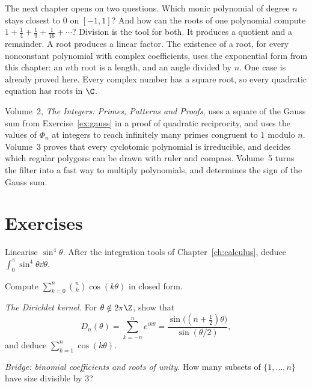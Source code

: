 The next chapter opens on two questions. Which monic polynomial of degree $n$ stays closest to $0$ on $[-1,1]$? And how can the roots of one polynomial compute $1+\frac14+\frac19+\frac1{16}+\cdots$? Division is the tool for both. It produces a quotient and a remainder. A root produces a linear factor. The existence of a root, for every nonconstant polynomial with complex coefficients, uses the exponential form from this chapter: an $n$th root is a length, and an angle divided by $n$. One case is already proved here. Every complex number has a square root, so every quadratic equation has roots in $\C$.

Volume~2, \emph{The Integers: Primes, Patterns and Proofs}, uses a square of the Gauss sum from Exercise~\ref{ex:gauss} in a proof of quadratic reciprocity, and uses the values of $\Phi_n$ at integers to reach infinitely many primes congruent to $1$ modulo $n$. Volume~3 proves that every cyclotomic polynomial is irreducible, and decides which regular polygons can be drawn with ruler and compass. Volume~5 turns the filter into a fast way to multiply polynomials, and determines the sign of the Gauss sum.

\section{Exercises}

\begin{exercise}[$\star$]\label{ex:lin}
Linearise $\sin^4\theta$. After the integration tools of Chapter~\ref{ch:calculus}, deduce $\displaystyle\int_0^{\pi}\sin^4\theta\dd\theta$.
\end{exercise}

\begin{exercise}[$\star$]\label{ex:binomcos}
Compute $\displaystyle\sum_{k=0}^n\binom nk\cos(k\theta)$ in closed form.
\end{exercise}

\begin{exercise}[$\star\star$]\label{ex:dirichlet}
\emph{The Dirichlet kernel.} For $\theta\notin2\pi\Z$, show that
\[
D_n(\theta)=\sum_{k=-n}^ne^{ik\theta}=\frac{\sin\bigl((n+\tfrac12)\theta\bigr)}{\sin(\theta/2)},
\]
and deduce $\displaystyle\sum_{k=1}^n\cos(k\theta)$.
\end{exercise}

\begin{exercise}[$\star\star$]\label{ex:mod3}
\emph{Bridge: binomial coefficients and roots of unity.}
How many subsets of $\{1,\dots,n\}$ have size divisible by $3$?
\end{exercise}

